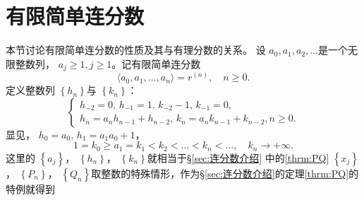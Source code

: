 \section{有限简单连分数} \label{sec:有限简单连分数}
本节讨论有限简单连分数的性质及其与有理分数的关系。
设 \( a_0, a_1, a_2, \dots \)是一个无限整数列， \( a_j \geqslant 1, j \geqslant 1 \)。记有限简单连分数
\begin{equation}
	\langle a_0, a_1, \dots, a_n \rangle = r^{(n)}, \quad n \geqslant 0. \label{eq:有限简单连分数}
\end{equation}
定义整数列 \( \left\{ h_n\right\} \)与 	\( \left\{k_n\right\} \)：
\begin{equation}\label{eq:hk定义}
	\begin{cases}
		h_{-2} = 0,\, h_{-1} = 1,\, k_{-2} - 1,\, k_{-1} = 0, \\
		h_n = a_nh_{n-1} + h_{n-2},\, k_n = a_nk_{n-1} + k_{n-2}, n \geqslant 0 .
	\end{cases}
\end{equation}
显见， \( h_0 = a_0,\, h_1 = a_1a_0 + 1 \)，
\begin{equation}
	1 = k_0 \geqslant a_1 = k_1 < k_2 < \dots < k_n < \dots, \quad k_n \to + \infty .
\end{equation}
这里的 \( \left\{ a_j \right\} \)， \(\left\{ h_n \right\}\)， \(\left\{ k_n
\right\}\)就相当于\S\ref{sec:连分数介绍} 中的\eqref{thrm:PQ} \(\left\{ x_j \right\}\)， \(\left\{ P_n \right\}\)，
\(\left\{ Q_n \right\}\)取整数的特殊情形，作为\S\ref{sec:连分数介绍}的定理\ref{thrm:PQ}的特例就得到
